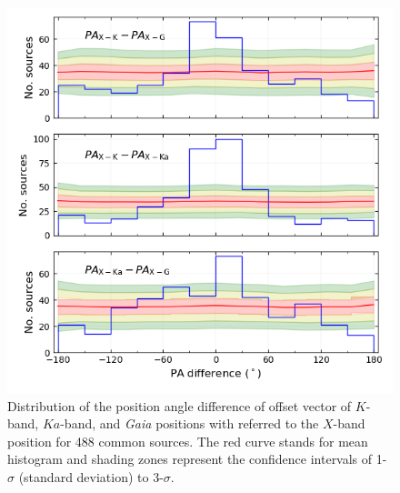 \documentclass{aa}
\begin{document}
    \begin{figure}[hbtp]
        \centering
        \includegraphics[width=\columnwidth]{figs/pa-diff.png}
        \caption[]{\label{fig:pa-diff}
            Distribution of the position angle difference of offset vector of $K$-band, $Ka$-band, and \textit{Gaia} positions with referred to the $X$-band position for 488 common sources.
            The red curve stands for mean histogram and shading zones represent the confidence intervals of 1-$\sigma$ (standard deviation) to 3-$\sigma$.
        }
    \end{figure}

\end{document}

